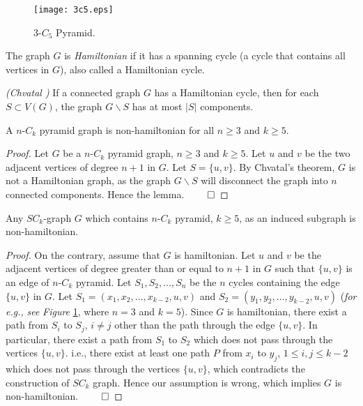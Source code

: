 \documentclass[runningheads]{llncs}
\begin{document}
\begin{figure}[h]
\begin{center}
\texttt{[image: 3c5.eps]}
\vspace{-0.5cm}
\caption{3-$C_5$ Pyramid.}
\label{fig: 3c5}
\end{center}
\end{figure}

\begin{definition}
 The graph $G$ is \emph{Hamiltonian} if it has a spanning cycle (a cycle that contains all vertices in $G$), also called a Hamiltonian cycle.
 \end{definition}
 
\begin{theorem}
\emph{(Chvatal \cite{chvatal})} If a connected graph $G$ has a Hamiltonian cycle, then for each $S \subset V(G)$, the graph $G\backslash S$ has at most $\vert S \vert $ components.
\end{theorem}


 
\begin{lemma}
\label{ncknonhamiltonian}
A $n$-$C_k$ pyramid graph is non-hamiltonian for all $n \geq 3$ and $k \geq 5$.
\end{lemma}
\begin{proof}
Let $G$ be a $n$-$C_k$ pyramid graph, $n \geq 3$ and $k \geq 5$. Let $u$ and $v$ be the two adjacent vertices of degree $n+1$ in $G$. Let $S = \{u, v\}$. By Chvatal's theorem, $G$ is not a Hamiltonian graph, as the graph $G\backslash S$ will disconnect the graph into $n$ connected components. Hence the lemma.
$\hfill \qed$
\end{proof}

\begin{lemma}
\label{ncknonhamiltoniansubclass}
Any $SC_k$-graph $G$ which contains $n$-$C_k$ pyramid, $k \geq 5$, as an induced subgraph is non-hamiltonian.
\end{lemma}
\begin{proof}
On the contrary, assume that $G$ is hamiltonian. Let $u$ and $v$ be the adjacent vertices of degree greater than or equal to $n+1$ in $G$ such that $\{u, v\}$ is an edge of $n$-$C_k$ pyramid. Let $S_1, S_2, \ldots, S_n$ be the $n$ cycles containing the edge $\{u, v\}$ in $G$. Let $S_1 = (x_1, x_2, \ldots, x_{k-2}, u, v)$ and $S_2 = (y_1, y_2, \ldots, y_{k-2}, u, v)$ (\emph{for e.g.,} \emph{see} \emph{Figure } \ref{fig: 3c5}, where $n=3$ and $k=5$). Since $G$ is hamiltonian, there exist a path from $S_i$ to $S_j$, $i \neq j$ other than the path through the edge $\{u, v\}$. In particular, there exist a path from $S_1$ to $S_2$ which does not pass through the vertices $\{u, v\}$. i.e., there exist at least one path $P$ from $x_i$ to $y_j$, $1 \leq i, j \leq k-2$ which does not pass through the vertices $\{u, v\}$, which contradicts the construction of $SC_k$ graph. Hence our assumption is wrong, which implies $G$ is non-hamiltonian. $\hfill \qed$ 
\end{proof}
\end{document}
